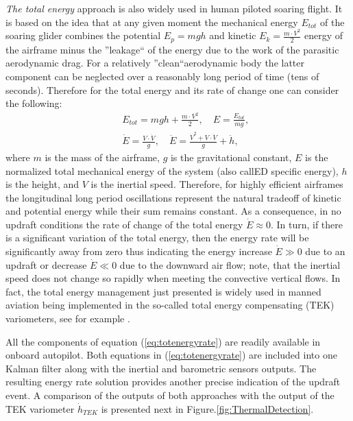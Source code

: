 \documentclass{ifacconf}
\begin{document}
\emph{The total energy} approach is also widely used in human piloted soaring flight. It is based on the idea that at any given moment the mechanical energy $E_{tot}$ of the soaring glider combines the potential $E_p=mgh$ and kinetic $E_k=\frac{m\cdot V^2}{2}$ energy of the airframe minus the ''leakage`` of the energy due to the work of the parasitic aerodynamic drag. For a relatively ''clean``aerodynamic body the latter component can be neglected over a reasonably long period of time (tens of seconds). Therefore for the total energy and its rate of change one can consider the following:
\begin{eqnarray}
    && E_{tot}=mgh+\frac{m\cdot V^2}{2}, \quad E=\frac{E_{tot}}{mg}, \nonumber \\
    && \dot{E}=\frac{V \cdot \dot{V}}{g}, \quad \ddot{E}=\frac{\dot{V}^2 + V \cdot \ddot{V}}{g} + \ddot{h},
    \label{eq:totenergyrate}
\end{eqnarray}
where $m$ is the mass of the airframe, $g$ is the gravitational constant, $E$ is the normalized total mechanical energy of the system (also callED specific energy), $h$ is the height, and $V$ is the inertial speed. Therefore, for highly efficient airframes the longitudinal long period oscillations represent the natural tradeoff of kinetic and potential energy while their sum remains constant. As a consequence, in no updraft conditions the rate of change of the total energy $\dot{E}\approx 0$. In turn, if there is a significant variation of the total energy, then the energy rate will be significantly away from zero thus indicating the energy increase $\dot{E} \gg 0$ due to an updraft or decrease $\dot{E} \ll 0$ due to the downward air flow; note, that the inertial speed does not change so rapidly when meeting the convective vertical flows. In fact, the total energy management just presented is widely used in manned aviation being implemented in the so-called total energy compensating (TEK) variometers, see for example \cite{PitLab:2013:Online}.  

All the components of equation (\ref{eq:totenergyrate}) are readily available in onboard autopilot. Both equations in (\ref{eq:totenergyrate}) are included into one Kalman filter along with the inertial and barometric sensors outputs. The resulting energy rate solution provides another precise indication of the updraft event. A comparison of the outputs of both approaches with the output  of the TEK variometer $\dot{h}_{TEK}$ is presented next in Figure.\ref{fig:ThermalDetection}.
\end{document}
